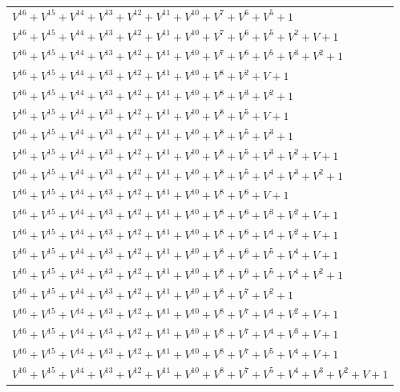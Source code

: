 \documentclass[12pt]{article}
\begin{document}
\begin{adjustwidth}{-4cm}{}
\begin{center}
\begin{longtable}{|l|}
$V^{16}  +V^{15}  +V^{14}  +V^{13}  +V^{12}  +V^{11}  +V^{10}  +V^{7}  +V^{6}  +V^{5}  + 1$ \\
$V^{16}  +V^{15}  +V^{14}  +V^{13}  +V^{12}  +V^{11}  +V^{10}  +V^{7}  +V^{6}  +V^{5}  +V^{2}  + V + 1$ \\
$V^{16}  +V^{15}  +V^{14}  +V^{13}  +V^{12}  +V^{11}  +V^{10}  +V^{7}  +V^{6}  +V^{5}  +V^{3}  +V^{2}  + 1$ \\
$V^{16}  +V^{15}  +V^{14}  +V^{13}  +V^{12}  +V^{11}  +V^{10}  +V^{8}  +V^{2}  + V + 1$ \\
$V^{16}  +V^{15}  +V^{14}  +V^{13}  +V^{12}  +V^{11}  +V^{10}  +V^{8}  +V^{3}  +V^{2}  + 1$ \\
$V^{16}  +V^{15}  +V^{14}  +V^{13}  +V^{12}  +V^{11}  +V^{10}  +V^{8}  +V^{5}  + V + 1$ \\
$V^{16}  +V^{15}  +V^{14}  +V^{13}  +V^{12}  +V^{11}  +V^{10}  +V^{8}  +V^{5}  +V^{3}  + 1$ \\
$V^{16}  +V^{15}  +V^{14}  +V^{13}  +V^{12}  +V^{11}  +V^{10}  +V^{8}  +V^{5}  +V^{3}  +V^{2}  + V + 1$ \\
$V^{16}  +V^{15}  +V^{14}  +V^{13}  +V^{12}  +V^{11}  +V^{10}  +V^{8}  +V^{5}  +V^{4}  +V^{3}  +V^{2}  + 1$ \\
$V^{16}  +V^{15}  +V^{14}  +V^{13}  +V^{12}  +V^{11}  +V^{10}  +V^{8}  +V^{6}  + V + 1$ \\
$V^{16}  +V^{15}  +V^{14}  +V^{13}  +V^{12}  +V^{11}  +V^{10}  +V^{8}  +V^{6}  +V^{3}  +V^{2}  + V + 1$ \\
$V^{16}  +V^{15}  +V^{14}  +V^{13}  +V^{12}  +V^{11}  +V^{10}  +V^{8}  +V^{6}  +V^{4}  +V^{2}  + V + 1$ \\
$V^{16}  +V^{15}  +V^{14}  +V^{13}  +V^{12}  +V^{11}  +V^{10}  +V^{8}  +V^{6}  +V^{5}  +V^{4}  + V + 1$ \\
$V^{16}  +V^{15}  +V^{14}  +V^{13}  +V^{12}  +V^{11}  +V^{10}  +V^{8}  +V^{6}  +V^{5}  +V^{4}  +V^{2}  + 1$ \\
$V^{16}  +V^{15}  +V^{14}  +V^{13}  +V^{12}  +V^{11}  +V^{10}  +V^{8}  +V^{7}  +V^{2}  + 1$ \\
$V^{16}  +V^{15}  +V^{14}  +V^{13}  +V^{12}  +V^{11}  +V^{10}  +V^{8}  +V^{7}  +V^{4}  +V^{2}  + V + 1$ \\
$V^{16}  +V^{15}  +V^{14}  +V^{13}  +V^{12}  +V^{11}  +V^{10}  +V^{8}  +V^{7}  +V^{4}  +V^{3}  + V + 1$ \\
$V^{16}  +V^{15}  +V^{14}  +V^{13}  +V^{12}  +V^{11}  +V^{10}  +V^{8}  +V^{7}  +V^{5}  +V^{4}  + V + 1$ \\
$V^{16}  +V^{15}  +V^{14}  +V^{13}  +V^{12}  +V^{11}  +V^{10}  +V^{8}  +V^{7}  +V^{5}  +V^{4}  +V^{3}  +V^{2}  + V + 1$ \\

\end{longtable}
\end{center}
\end{adjustwidth}
\end{document}
